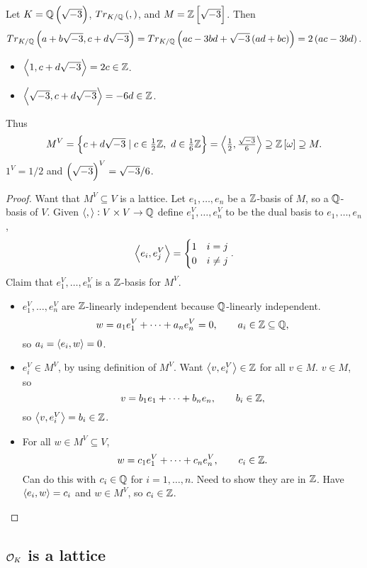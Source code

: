 \begin{example*}
Let $ K = \Q\br{\sqrt{-3}} $, $ Tr_{K / \Q}\br{,} $, and $ M = \Z\sbr{\sqrt{-3}} $. Then
$$ Tr_{K / \Q}\br{a + b\sqrt{-3}, c + d\sqrt{-3}} = Tr_{K / \Q}\br{ac - 3bd + \sqrt{-3}\br{ad + bc}} = 2\br{ac - 3bd}. $$
\begin{itemize}
\item $ \left\langle 1, c + d\sqrt{-3} \right\rangle = 2c \in \mathbb{Z} $.
\item $ \left\langle \sqrt{-3}, c + d\sqrt{-3} \right\rangle = -6d \in \mathbb{Z} $.
\end{itemize}
Thus
$$ M^V = \cbr{c + d\sqrt{-3} \mid c \in \tfrac{1}{2}\Z, \ d \in \tfrac{1}{6}\Z} = \abr{\tfrac{1}{2}, \tfrac{\sqrt{-3}}{6}} \supseteq \Z\sbr{\omega} \supseteq M. $$
$ 1^V = 1 / 2 $ and $ \br{\sqrt{-3}}^V = \sqrt{-3} / 6 $.
\end{example*}

\begin{proof}
Want that $ M^V \subseteq V $ is a lattice. Let $ e_1, \dots, e_n $ be a $ \mathbb{Z} $-basis of $ M $, so a $ \mathbb{Q} $-basis of $ V $. Given $ \left\langle , \right\rangle : V \times V \to \mathbb{Q} $ define $ e_1^V, \dots, e_n^V $ to be the dual basis to $ e_1, \dots, e_n $,
$$ \left\langle e_i, e_j^V \right\rangle =
\begin{cases}
1 & i = j \\
0 & i \ne j
\end{cases}.
$$
Claim that $ e_1^V, \dots, e_n^V $ is a $ \mathbb{Z} $-basis for $ M^V $.
\begin{itemize}
\item $ e_1^V, \dots, e_n^V $ are $ \mathbb{Z} $-linearly independent because $ \mathbb{Q} $-linearly independent.
$$ w = a_1e_1^V + \dots + a_ne_n^V = 0, \qquad a_i \in \mathbb{Z} \subseteq \mathbb{Q}, $$
so $ a_i = \left\langle e_i, w \right\rangle = 0 $.
\item $ e_i^V \in M^V $, by using definition of $ M^V $. Want $ \left\langle v, e_i^V \right\rangle \in \mathbb{Z} $ for all $ v \in M $. $ v \in M $, so
$$ v = b_1e_1 + \dots + b_ne_n, \qquad b_i \in \mathbb{Z}, $$
so $ \left\langle v, e_i^V \right\rangle = b_i \in \mathbb{Z} $.
\item For all $ w \in M^V \subseteq V $,
$$ w = c_1e_1^V + \dots + c_ne_n^V, \qquad c_i \in \mathbb{Z}. $$
Can do this with $ c_i \in \mathbb{Q} $ for $ i = 1, \dots, n $. Need to show they are in $ \mathbb{Z} $. Have $ \left\langle e_i, w \right\rangle = c_i $ and $ w \in M^V $, so $ c_i \in \mathbb{Z} $.
\end{itemize}
\end{proof}

\pagebreak

\subsection{$ \mathcal{O}_K $ is a lattice}

